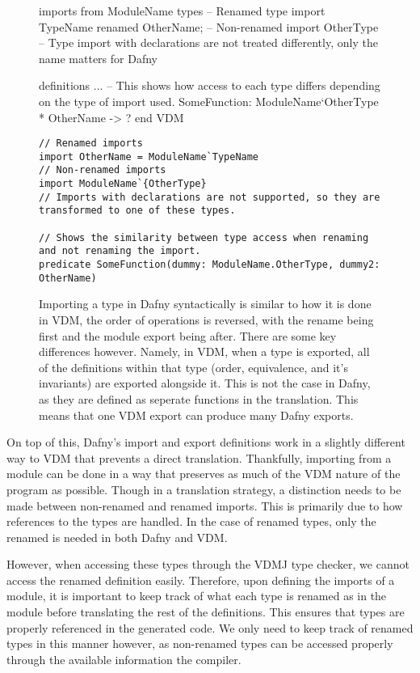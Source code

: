 \documentclass{entcs}
\begin{document}
\begin{figure}[h]
	\begin{center}
        \begin{vdmsl}

imports from ModuleName 
    types 
        -- Renamed type import 
        TypeName renamed OtherName;
        -- Non-renamed import 
        OtherType
        -- Type import with declarations are not treated differently, only the name matters for Dafny

definitions
...
-- This shows how access to each type differs depending on the type of import used.
SomeFunction: ModuleName`OtherType * OtherName -> ?
end VDM

        
        \end{vdmsl}
        \begin{lstlisting}
// Renamed imports
import OtherName = ModuleName`TypeName
// Non-renamed imports
import ModuleName`{OtherType}
// Imports with declarations are not supported, so they are transformed to one of these types.

// Shows the similarity between type access when renaming and not renaming the import.
predicate SomeFunction(dummy: ModuleName.OtherType, dummy2: OtherName)
        \end{lstlisting}
		\caption{Importing a type in Dafny syntactically is similar to how it is done in VDM, the order of operations is reversed, with the rename being first and the module export being after. There are some key differences however. Namely, in VDM, when a type is exported, all of the definitions within that type (order, equivalence, and it's invariants) are exported alongside it. This is not the case in Dafny, as they are defined as seperate functions in the translation. This means that one VDM export can produce many Dafny exports.}\label{fig:dafny_imports}
	\end{center}
\end{figure}

On top of this, Dafny's import and export definitions work in a slightly different way to VDM that prevents a direct translation. Thankfully, importing from a module can be done in a way that preserves as much of the VDM nature of the program as possible. Though in a translation strategy, a distinction needs to be made between non-renamed and renamed imports. This is primarily due to how references to the types are handled. In the case of renamed types, only the renamed is needed in both Dafny and VDM. 

However, when accessing these types through the VDMJ type checker, we cannot access the renamed definition easily. Therefore, upon defining the imports of a module, it is important to keep track of what each type is renamed as in the module before translating the rest of the definitions. This ensures that types are properly referenced in the generated code. We only need to keep track of renamed types in this manner however, as non-renamed types can be accessed properly through the available information the compiler.
\end{document}
